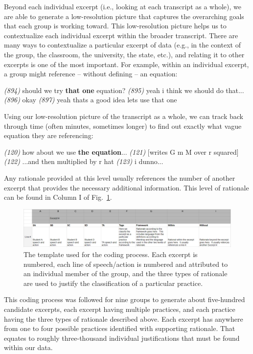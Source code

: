 \documentclass{msuphddissertation}
\begin{document}
\begin{doublespace}
Beyond each individual excerpt (i.e., looking at each transcript as a whole), we are able to generate a low-resolution picture that captures the overarching goals that each group is working toward.  This low-resolution picture helps us to contextualize each individual excerpt within the broader transcript.  There are many ways to contextualize a particular excerpt of data (e.g., in the context of the group, the classroom, the university, the state, etc.), and relating it to other excerpts is one of the most important.  For example, within an individual excerpt, a group might reference -- without defining -- an equation: \begin{description}
\SA \textit{(894)} should we try \textbf{that one} equation?
\SB \textit{(895)} yeah i think we should do that...
\SA \textit{(896)} okay
\SC \textit{(897)} yeah thats a good idea lets use that one
\end{description}  Using our low-resolution picture of the transcript as a whole, we can track back through time (often minutes, sometimes longer) to find out exactly what vague equation they are referencing: \begin{description}
\SC \textit{(120)} how about we use \textbf{the equation}...
\SC \textit{(121)} [writes G m M over r squared]
\SC \textit{(122)} ...and then multiplied by r hat
\SD \textit{(123)} i dunno...
\end{description}  Any rationale provided at this level usually references the number of another excerpt that provides the necessary additional information.  This level of rationale can be found in Column I of Fig.~\ref{CH5:Types}.

\begin{figure}\centering
\includegraphics[scale=0.42]{./images/CH5Levels.pdf}
\caption{The template used for the coding process.  Each excerpt is numbered, each line of speech/action is numbered and attributed to an individual member of the group, and the three types of rationale are used to justify the classification of a particular practice.}\label{CH5:Types}
\end{figure}

This coding process was followed for nine groups to generate about five-hundred candidate excerpts, each excerpt having multiple practices, and each practice having the three types of rationale described above.  Each excerpt has anywhere from one to four possible practices identified with supporting rationale.  That equates to roughly three-thousand individual justifications that must be found within our data.


\end{doublespace}
\end{document}

